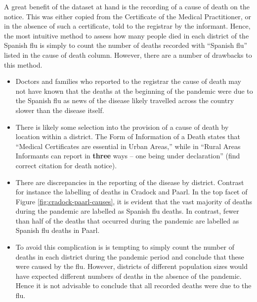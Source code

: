 \documentclass[fleqn,10pt,lineno]{wlpeerj} %
\providecommand{\tightlist}{
\setlength{\itemsep}{0pt}\setlength{\parskip}{0pt}}
\begin{document}
A great benefit of the dataset at hand is the recording of a cause of death on the notice. This was either copied from the Certificate of the Medical Practitioner, or in the absence of such a certificate, told to the registrar by the informant. Hence, the most intuitive method to assess how many people died in each district of the Spanish flu is simply to count the number of deaths recorded with ``Spanish flu'' listed in the cause of death column. However, there are a number of drawbacks to this method.

\begin{itemize}
\tightlist
\item
  Doctors and families who reported to the registrar the cause of death may not have known that the deaths at the beginning of the pandemic were due to the Spanish flu as news of the disease likely travelled across the country slower than the disease itself.
\item
  There is likely some selection into the provision of a cause of death by location within a district. The Form of Information of a Death states that ``Medical Certificates are essential in Urban Areas,'' while in ``Rural Areas Informants can report in \textbf{three} ways -- one being under declaration'' (find correct citation for death notice).
\item
  There are discrepancies in the reporting of the disease by district. Contrast for instance the labelling of deaths in Cradock and Paarl. In the top facet of Figure \ref{fig:cradock-paarl-causes}, it is evident that the vast majority of deaths during the pandemic are labelled as Spanish flu deaths. In contrast, fewer than half of the deaths that occurred during the pandemic are labelled as Spanish flu deaths in Paarl.
\item
  To avoid this complication is is tempting to simply count the number of deaths in each district during the pandemic period and conclude that these were caused by the flu. However, districts of different population sizes would have expected different numbers of deaths in the absence of the pandemic. Hence it is not advisable to conclude that all recorded deaths were due to the flu.
\end{itemize}
\end{document}
